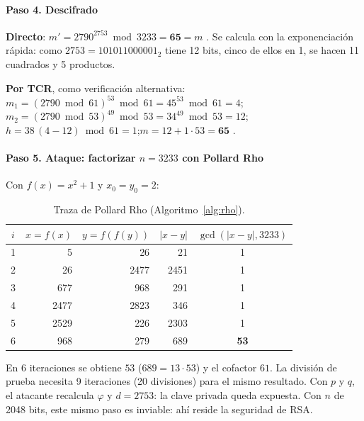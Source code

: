 \paragraph{Paso 4. Descifrado}

\textbf{Directo}:
$m' = 2790^{2753} \bmod 3233 = \mathbf{65} = m$ \checkmark. Se calcula con la
exponenciación rápida: como $2753 = 101011000001_2$ tiene 12 bits, cinco de ellos
en 1, se hacen 11 cuadrados y 5 productos.

\textbf{Por TCR}, como verificación alternativa:\\
$m_1 = (2790 \bmod 61)^{53} \bmod 61 = 45^{53} \bmod 61 = 4$;\quad
$m_2 = (2790 \bmod 53)^{49} \bmod 53 = 34^{49} \bmod 53 = 12$;\\
$h = 38\,(4 - 12) \bmod 61 = 1$;\quad $m = 12 + 1 \cdot 53 = \mathbf{65}$ \checkmark.

\paragraph{Paso 5. Ataque: factorizar $n = 3233$ con Pollard Rho}

Con $f(x) = x^2 + 1$ y $x_0 = y_0 = 2$:

\begin{table}[H]
\centering\small
\caption{Traza de Pollard Rho (Algoritmo~\ref{alg:rho}).}
\label{tab:traza-rho}
\begin{tabular}{@{}c r r r c@{}}
\toprule
$i$ & $x = f(x)$ & $y = f(f(y))$ & $|x - y|$ & $\gcd(|x-y|, 3233)$\\
\midrule
1 & 5 & 26 & 21 & 1\\
2 & 26 & 2477 & 2451 & 1\\
3 & 677 & 968 & 291 & 1\\
4 & 2477 & 2823 & 346 & 1\\
5 & 2529 & 226 & 2303 & 1\\
6 & 968 & 279 & 689 & \textbf{53}\\
\bottomrule
\end{tabular}
\end{table}
\noindent En 6 iteraciones se obtiene $53$ ($689 = 13 \cdot 53$) y el cofactor
$61$. La división de prueba necesita 9 iteraciones (20 divisiones) para el
mismo resultado. Con $p$ y $q$, el atacante recalcula $\varphi$ y $d = 2753$:
la clave privada queda expuesta. Con $n$ de 2048 bits, este mismo paso es
inviable: ahí reside la seguridad de RSA.
